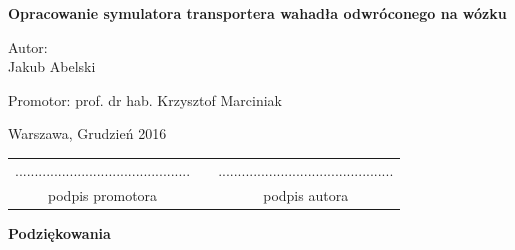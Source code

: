 \documentclass[12pt, oneside]{report}
\theoremstyle{definition}
\begin{document}
\begin{titlepage}
\linespread{1.5}
\begin{center}
\Huge
\textbf{Opracowanie symulatora transportera wahadła odwróconego na wózku}
\end{center}


\vfill
\begin{center}
\Large
Autor:\\
\LARGE Jakub Abelski
\end{center}
\vfill
\begin{center}
\Large
Promotor: prof. dr hab. Krzysztof Marciniak
\end{center}
\vfill
\begin{center}
\large
Warszawa, Grudzień 2016
\end{center}

\newpage
\hfill
\begin{table}[b]
\centering
\begin{tabular}[t]{ccc}
............................................. & \hspace*{100pt} & .............................................\\
podpis promotora & \hspace*{100pt} & podpis autora
\end{tabular}
\end{table}
\end{titlepage}

\setlength{\parindent}{5ex}

\begin{abstract}
\end{abstract}

\newpage
\pagestyle{empty}
\vspace*{\fill}
\begin{center}
\LARGE\textbf{Podziękowania}\\
\end{center}

\vspace{\fill}

\newpage
\pagestyle{plain}
\setcounter{page}{3}
\tableofcontents

\newpage
\pagestyle{headings}
\end{document}
